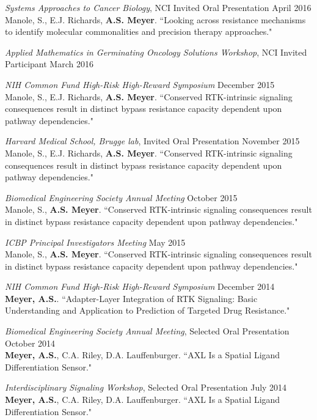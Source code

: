 \documentclass[11pt]{res}
\begin{document}
\begin{resume}
{\sl Systems Approaches to Cancer Biology}, NCI Invited Oral Presentation \hfill April 2016 \\
Manole, S., E.J. Richards, {\bf A.S. Meyer}. ``Looking across resistance mechanisms to identify molecular commonalities and precision therapy approaches."

{\sl Applied Mathematics in Germinating Oncology Solutions Workshop}, NCI Invited Participant \hfill March 2016

{\sl NIH Common Fund High-Risk High-Reward Symposium} \hfill December 2015 \\
Manole, S., E.J. Richards, {\bf A.S. Meyer}. ``Conserved RTK-intrinsic signaling consequences result in distinct bypass resistance capacity dependent upon pathway dependencies."

{\sl Harvard Medical School, Brugge lab}, Invited Oral Presentation \hfill November 2015 \\
Manole, S., E.J. Richards, {\bf A.S. Meyer}. ``Conserved RTK-intrinsic signaling consequences result in distinct bypass resistance capacity dependent upon pathway dependencies."

{\sl Biomedical Engineering Society Annual Meeting} \hfill October 2015 \\
Manole, S., {\bf A.S. Meyer}. ``Conserved RTK-intrinsic signaling consequences result in distinct bypass resistance capacity dependent upon pathway dependencies."

{\sl ICBP Principal Investigators Meeting} \hfill May 2015 \\
Manole, S., {\bf A.S. Meyer}. ``Conserved RTK-intrinsic signaling consequences result in distinct bypass resistance capacity dependent upon pathway dependencies."

{\sl NIH Common Fund High-Risk High-Reward Symposium} \hfill December 2014 \\
{\bf Meyer, A.S.}. ``Adapter-Layer Integration of RTK Signaling: Basic Understanding and Application to Prediction of Targeted Drug Resistance."

{\sl Biomedical Engineering Society Annual Meeting}, Selected Oral Presentation \hfill October 2014 \\
{\bf Meyer, A.S.}, C.A. Riley, D.A. Lauffenburger. ``AXL Is a Spatial Ligand Differentiation Sensor."

{\sl Interdisciplinary Signaling Workshop}, Selected Oral Presentation \hfill July 2014 \\
{\bf Meyer, A.S.}, C.A. Riley, D.A. Lauffenburger. ``AXL Is a Spatial Ligand Differentiation Sensor."


\end{resume}
\end{document}
